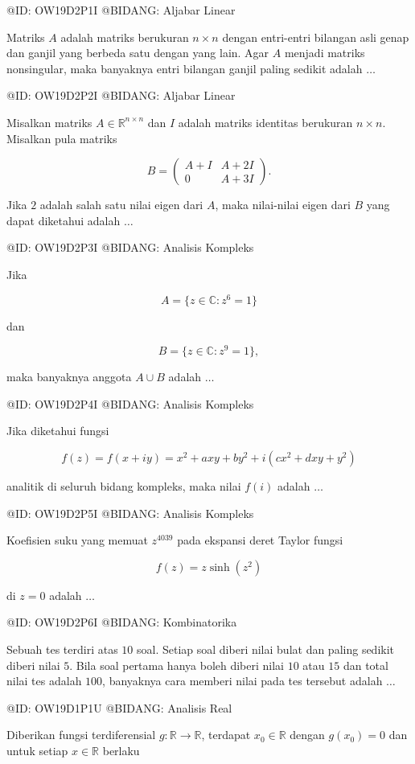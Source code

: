 @ID: OW19D2P1I
@BIDANG: Aljabar Linear

Matriks $A$ adalah matriks berukuran $n\times n$ dengan entri-entri bilangan asli genap dan ganjil yang berbeda satu dengan yang lain. Agar $A$ menjadi matriks nonsingular, maka banyaknya entri bilangan ganjil paling sedikit adalah $\ldots$

@ID: OW19D2P2I
@BIDANG: Aljabar Linear

Misalkan matriks $A\in\mathbb R^{n\times n}$ dan $I$ adalah matriks identitas berukuran $n\times n$. Misalkan pula matriks

$$
B=
\begin{pmatrix}
A+I & A+2I\\
0 & A+3I
\end{pmatrix}.
$$

Jika $2$ adalah salah satu nilai eigen dari $A$, maka nilai-nilai eigen dari $B$ yang dapat diketahui adalah $\ldots$

@ID: OW19D2P3I
@BIDANG: Analisis Kompleks

Jika

$$
A=\{z\in\mathbb C: z^6=1\}
$$

dan

$$
B=\{z\in\mathbb C: z^9=1\},
$$

maka banyaknya anggota $A\cup B$ adalah $\ldots$

@ID: OW19D2P4I
@BIDANG: Analisis Kompleks

Jika diketahui fungsi

$$
f(z)=f(x+iy)=x^2+axy+by^2+i(cx^2+dxy+y^2)
$$

analitik di seluruh bidang kompleks, maka nilai $f(i)$ adalah $\ldots$

@ID: OW19D2P5I
@BIDANG: Analisis Kompleks

Koefisien suku yang memuat $z^{4039}$ pada ekspansi deret Taylor fungsi

$$
f(z)=z\sinh(z^2)
$$

di $z=0$ adalah $\ldots$

@ID: OW19D2P6I
@BIDANG: Kombinatorika

Sebuah tes terdiri atas $10$ soal. Setiap soal diberi nilai bulat dan paling sedikit diberi nilai $5$. Bila soal pertama hanya boleh diberi nilai $10$ atau $15$ dan total nilai tes adalah $100$, banyaknya cara memberi nilai pada tes tersebut adalah $\ldots$

@ID: OW19D1P1U
@BIDANG: Analisis Real

Diberikan fungsi terdiferensial $g:\mathbb R\to\mathbb R$, terdapat $x_0\in\mathbb R$ dengan $g(x_0)=0$ dan untuk setiap $x\in\mathbb R$ berlaku

